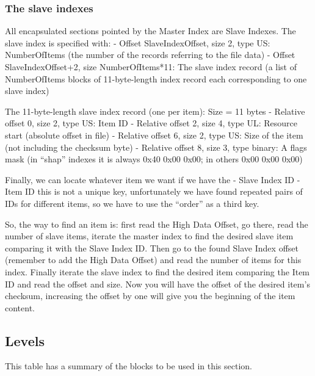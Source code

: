 \documentclass{article}
\begin{document}
\subsubsection{The slave indexes \label{slave indexes}} %
 All encapsulated sections pointed by the Master Index are Slave Indexes.
 The slave index is specified with:
  - Offset SlaveIndexOffset,   size 2, type US: NumberOfItems
           (the number of the records referring to the file data)
  - Offset SlaveIndexOffset+2, size NumberOfItems*11: The slave index
           record (a list of NumberOfItems blocks of 11-byte-length index
           record each corresponding to one slave index)

 The 11-byte-length slave index record (one per item): Size = 11 bytes
  - Relative offset 0, size 2, type US: Item ID
  - Relative offset 2, size 4, type UL: Resource start
           (absolute offset in file)
  - Relative offset 6, size 2, type US: Size of the item
           (not including the checksum byte)
  - Relative offset 8, size 3, type binary: A flags mask
           (in ``shap'' indexes it is always 0x40 0x00 0x00;
           in others 0x00 0x00 0x00)

 Finally, we can locate whatever item we want if we have the
  - Slave Index ID
  - Item ID
 this is not a unique key, unfortunately we have found repeated pairs of
 IDs for different items, so we have to use the ``order'' as a third key.

 So, the way to find an item is: first read the High Data Offset, go there,
 read the number of slave items, iterate the master index to find the
 desired slave item comparing it with the Slave Index ID. Then go to the
 found Slave Index offset (remember to add the High Data Offset) and read
 the number of items for this index. Finally iterate the slave index to
 find the desired item comparing the Item ID and read the offset and size.
 Now you will have the offset of the desired item's checksum, increasing
 the offset by one will give you the beginning of the item content.

\subsection{Levels}

 This table has a summary of the blocks to be used in this section.
\end{document}
